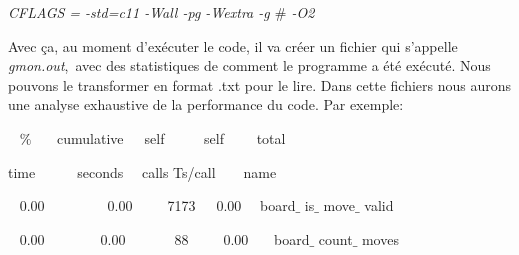 \documentclass[a4paper,12pt]{article}
\begin{document}
\vspace{\baselineskip}

\noindent \begin{Center}
\textit{CFLAGS = -std=c11 -Wall -pg -Wextra -g $\#$ -O2}
\end{Center}\par


\vspace{\baselineskip}

\noindent \begin{justify}
Avec ça, au moment d’exécuter le code, il va créer un fichier qui s’appelle \textit{gmon.out},~avec des statistiques de comment le programme a été exécuté.  Nous pouvons le transformer en format .txt pour le lire. Dans cette fichiers nous aurons une analyse exhaustive de la performance du code. Par exemple:
\end{justify}\par


\noindent \begin{justify}
~ \hspace*{0.49in}\hspace*{0.49in}\hspace*{0.49in}$\%$ ~~~cumulative~~~self~~~~~   self~~~~ total~~~~~~~~~~ 
\end{justify}\par


\noindent \begin{justify}
 \hspace*{0.49in}\hspace*{0.49in}\hspace*{0.49in}time~~~~~~seconds~~ calls  Ts/call~~~~name~~  
\end{justify}\par


\noindent \begin{justify}
~ \hspace*{0.49in}\hspace*{0.49in}\hspace*{0.49in}0.00~~~~~~~~~0.00~~~~~7173~~~0.00~~    board$ \_ $ is$ \_ $ move$ \_ $ valid
\end{justify}\par


\noindent \begin{justify}
~ \hspace*{0.49in}\hspace*{0.49in}\hspace*{0.49in}0.00~~~~~~~~0.00~~~~~~~88~~~~~0.00~~~    board$ \_ $ count$ \_ $ moves
\end{justify}\par
\end{document}
